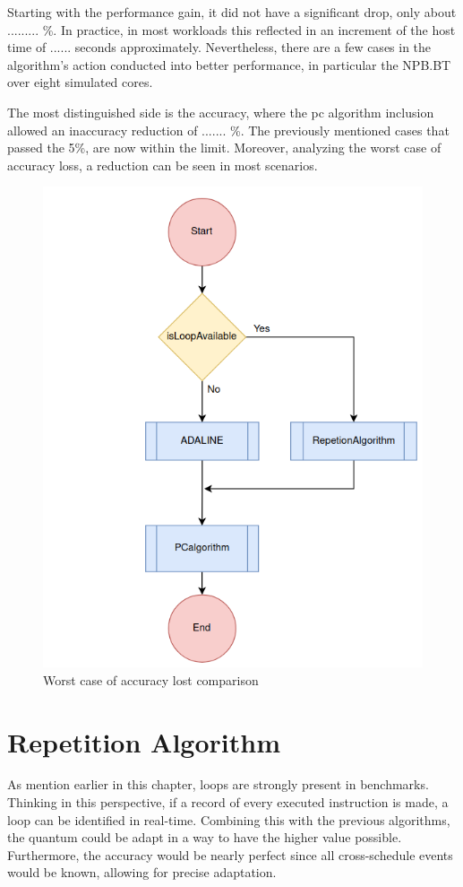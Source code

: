 Starting with the performance gain, it did not have a significant drop, only about  ......... \%. In practice, in most workloads this reflected in an increment of the host time of ...... seconds approximately. Nevertheless, there are a few cases in the algorithm's action conducted into better performance, in particular the NPB.BT over eight simulated cores. 

The most distinguished side is the accuracy, where the \gls{pc} algorithm inclusion allowed an inaccuracy reduction of ....... \%. The previously mentioned cases that passed the 5\%, are now within the limit. Moreover, analyzing the worst case of accuracy loss, a reduction can be seen in most scenarios.  

\begin{figure}[H]
	\centering
 	\includegraphics[width=0.5\linewidth]{Images/ADA_and_REP.png}
 	\caption{Worst case of accuracy lost comparison}
	 \label{fig_WorstCase_PC}
\end{figure}



\section{Repetition Algorithm}

As mention earlier in this chapter, loops are strongly present in benchmarks. Thinking in this perspective, if a record of every executed instruction is made, a loop can be identified in real-time. Combining this with the previous algorithms, the quantum could be adapt in a way to have the higher value possible. Furthermore, the accuracy would be nearly perfect since all cross-schedule events would be known, allowing for precise adaptation.


